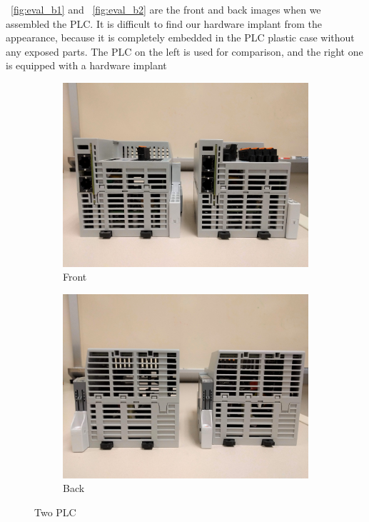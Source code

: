 ~\autoref{fig:eval_b1} and ~\autoref{fig:eval_b2} are the front and back images when we assembled the PLC. It is difficult to find our hardware implant from the appearance, because it is completely embedded in the PLC plastic case without any exposed parts. The PLC on the left is used for comparison, and the right one is equipped with a hardware implant

\begin{figure}[tp]
	\centering
    \begin{subfigure}[b]{0.23\textwidth}
    	\centering
	\includegraphics[width=1\textwidth]{figures/eval_b2}
        \vspace{-0.15in}
        \caption{Front}
		\label{fig:eval_b1}
	\end{subfigure}
	\begin{subfigure}[b]{0.23\textwidth}
    	\centering
	\includegraphics[width=1\textwidth]{figures/eval_b1}
        \vspace{-0.15in}
	\caption{Back}
		\label{fig:eval_b2}
	\end{subfigure}
    \vspace{-0.15in}
	\caption{Two PLC}
	\vspace{-0.15in}
\end{figure}

